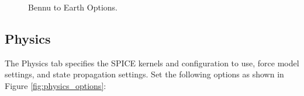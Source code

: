 \documentclass[11pt]{article}
\begin{document}
\begin{figure}[H]
	\centering
	\caption{\label{fig:bennu_to_earth_journey_options}Bennu to Earth Options.}
\end{figure}

\subsection{Physics}
\label{sec:physics}

The Physics tab specifies the \acs{SPICE} kernels and configuration to use, force model settings, and state propagation settings. Set the following options as shown in Figure \ref{fig:physics_options}:
\end{document}
